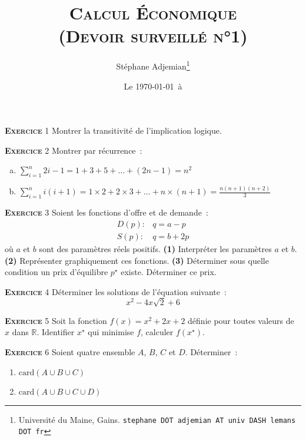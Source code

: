\documentclass[10pt,a4paper,notitlepage]{article}
\newcommand{\exercice}[1]{\textsc{\textbf{Exercice}} #1}
\begin{document}
\title{\textsc{Calcul Économique\\ \small{(Devoir surveillé n°1)}}}
\author{Stéphane Adjemian\thanks{Université du Maine, Gains. \texttt{stephane DOT adjemian AT univ DASH lemans DOT fr}}}
\date{Le \today\ à \thistime}

\maketitle


\exercice{1} Montrer la transitivité de l'implication logique.

\bigskip

\exercice{2} Montrer par récurrence :
\begin{enumerate}[(a)]
\item $\sum_{i=1}^n 2i-1 = 1+3+5+\dots+(2n-1)= n^2$
\item $\sum_{i=1}^n i(i+1) = 1\times2 + 2\times 3 + \dots +
  n\times(n+1) = \frac{n(n+1)(n+2)}{3}$ 
\end{enumerate}

\bigskip

\exercice{3} Soient les fonctions d'offre et de demande :
\[
\begin{split}
  D(p):& q = a - p\\
  S(p):& q = b + 2p
\end{split}
\] 
où $a$ et $b$ sont des paramètres réels positifs. \textbf{(1)} Interpréter les
paramètres $a$ et $b$. \textbf{(2)} Représenter graphiquement ces
fonctions. \textbf{(3)} Déterminer sous quelle condition un prix d'équilibre
$p^{\star}$ existe. Déterminer ce prix.

\bigskip

\exercice{4} Déterminer les solutions de l'équation suivante :
\[
x^2 - 4x\sqrt{2} + 6
\]

\bigskip

\exercice{5} 
Soit la fonction $f(x) = x^2+2x+2$ définie pour toutes valeurs de $x$
dans $\mathbb R$. Identifier $x^{\star}$ qui minimise $f$, calculer $f(x^{\star})$.

\bigskip

\exercice{6} Soient quatre ensemble $A$, $B$, $C$ et $D$. Déterminer :
\begin{enumerate}
\item $\mathrm{card}(A \cup B \cup C)$
\item $\mathrm{card}(A \cup B \cup C \cup D)$
\end{enumerate}
\end{document}
